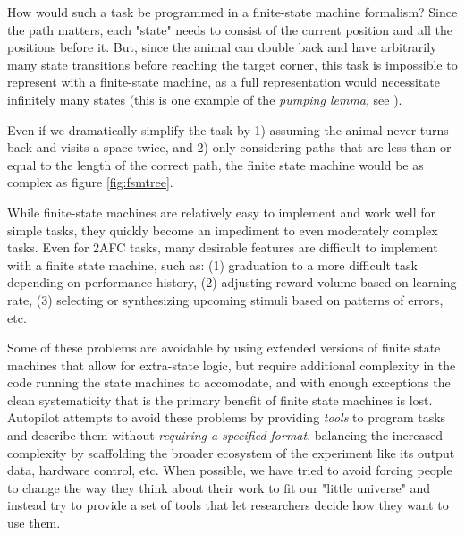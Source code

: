 How would such a task be programmed in a finite-state machine formalism? Since the path matters, each "state" needs to consist of the current position and all the positions before it. But, since the animal can double back and have arbitrarily many state transitions before reaching the target corner, this task is impossible to represent with a finite-state machine, as a full representation would necessitate infinitely many states (this is one example of the \textit{pumping lemma}, see \citep{kozenLimitationsFiniteAutomata1997}).

Even if we dramatically simplify the task by 1) assuming the animal never turns back and visits a space twice, and 2) only considering paths that are less than or equal to the length of the correct path, the finite state machine would be as complex as figure \ref{fig:fsmtree}. 

While finite-state machines are relatively easy to implement and work well for simple tasks, they quickly become an impediment to even moderately complex tasks. Even for 2AFC tasks, many desirable features are difficult to implement with a finite state machine, such as: (1) graduation to a more difficult task depending on performance history, (2) adjusting reward volume based on learning rate, (3) selecting or synthesizing upcoming stimuli based on patterns of errors\citep{bakAdaptiveOptimalTraining2016}, etc. 

Some of these problems are avoidable by using extended versions of finite state machines that allow for extra-state logic, but require additional complexity in the code running the state machines to accomodate, and with enough exceptions the clean systematicity that is the primary benefit of finite state machines is lost. Autopilot attempts to avoid these problems by providing \textit{tools} to program tasks and describe them without \textit{requiring a specified format}, balancing the increased complexity by scaffolding the broader ecosystem of the experiment like its output data, hardware control, etc. When possible, we have tried to avoid forcing people to change the way they think about their work to fit our "little universe" and instead try to provide a set of tools that let researchers decide how they want to use them.

